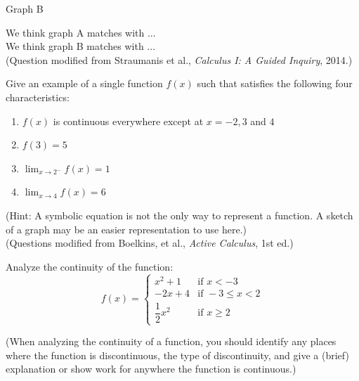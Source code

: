 \documentclass{ximera}
\begin{document}
\begin{exercise}
\begin{enumerate}
\begin{image}

        \end{image}
        Graph B\\

        We think graph A matches with ...\\
        We think graph B matches with ... \\
        (Question modified from Straumanis et al., \textit{Calculus I: A Guided Inquiry}, 2014.)
    \end{enumerate}
\end{exercise}

\begin{exercise}
    Give an example of a single function $f(x)$ such that satisfies the following four characteristics:\\
    \begin{enumerate} 
        \item $f(x)$ is continuous everywhere except at $x=-2, 3$ and $4$
        \item $f(3)=5$
        \item $\lim_{x\rightarrow 2^-}f(x)=1$
        \item $\lim_{x\rightarrow 4}f(x)=6$
    \end{enumerate}

    (Hint: A symbolic equation is not the only way to represent a function.  A sketch of a graph may be an easier representation to use here.)\\
    (Questions modified from Boelkins, et al., \textit{Active Calculus}, 1st ed.)
\end{exercise}

\begin{exercise}
  Analyze the continuity of the function:\\

\[ f(x) = 
  \begin{cases} 
     x^2+1 & \text{if } x < -3 \\ 
     -2x+4 & \text{if } -3 \leq x < 2 \\
     \dfrac{1}{2}x^2 & \text{if } x \geq 2 
  \end{cases}  \]

(When analyzing the continuity of a function, you should identify any places where the function is discontinuous, the type of discontinuity, and give a (brief) explanation or show work for anywhere the function is continuous.) 
\end{exercise}
\end{document}
